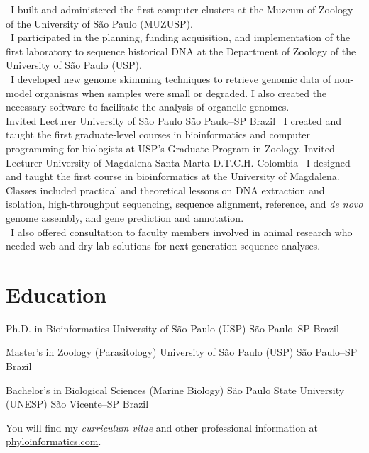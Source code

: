 \documentclass[11pt, letterpaper, sans]{moderncv}
\begin{document}
{
\textbullet~I built and administered the first computer clusters at the Muzeum of Zoology of the University of São Paulo (MUZUSP).\\ %
\textbullet~I participated in the planning, funding acquisition, and implementation of the first laboratory to sequence historical DNA at the Department of Zoology of the University of São Paulo (USP).\\ %
\textbullet~I developed new genome skimming techniques to retrieve genomic data of non-model organisms when samples were small or degraded. I also created the necessary software to facilitate the analysis of organelle genomes.\\ %
}
%
{Invited Lecturer}
{University of São Paulo}
{São Paulo--SP}
{Brazil}
{
\textbullet~I created and taught the first graduate-level courses in bioinformatics and computer programming for biologists at USP's Graduate Program in Zoology. %
}
%
{Invited Lecturer}
{University of Magdalena}
{Santa Marta D.T.C.H.}
{Colombia}
{
\textbullet~I designed and taught the first course in bioinformatics at the University of Magdalena. Classes included practical and theoretical lessons on DNA extraction and isolation, high-throughput sequencing, sequence alignment, reference, and \textit{de novo} genome assembly, and gene prediction and annotation.\\
\textbullet~I also offered consultation to faculty members involved in animal research who needed web and dry lab solutions for next-generation sequence analyses.
}


\vspace{-1em}

\section{Education}

{Ph.D. in Bioinformatics}
{University of São Paulo (USP)}
{São Paulo--SP}
{Brazil}
{}

{Master's in Zoology (Parasitology)}
{University of São Paulo (USP)}
{São Paulo--SP}
{Brazil}
{}

{Bachelor's in Biological Sciences (Marine Biology)}
{São Paulo State University (UNESP)}
{São Vicente--SP}
{Brazil}
{}

You will find my \textit{curriculum vitae} and other professional information at \href{https://phyloinformatics.com/members/Denis_Jacob_Machado.html}{phyloinformatics.com}.
\end{document}
